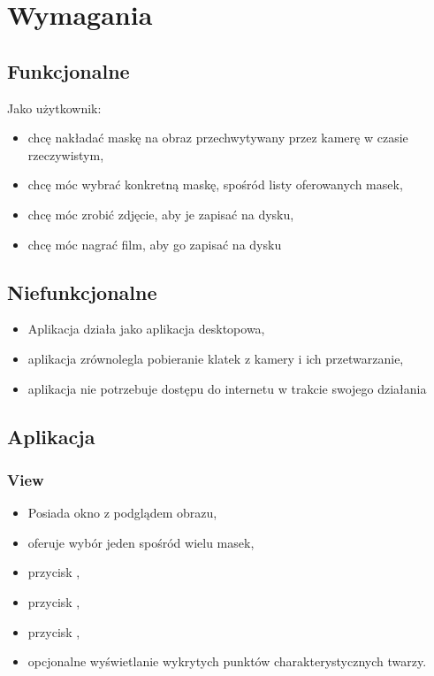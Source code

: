 \section{Wymagania}
\subsection{Funkcjonalne}
Jako użytkownik:
\begin{itemize}
    \item chcę nakładać maskę na obraz przechwytywany przez kamerę w czasie rzeczywistym,
    \item chcę móc wybrać konkretną maskę, spośród listy oferowanych masek,
    \item chcę móc zrobić zdjęcie, aby je zapisać na dysku,
    \item chcę móc nagrać film, aby go zapisać na dysku
\end{itemize}
\subsection{Niefunkcjonalne}
\begin{itemize}
    \item Aplikacja działa jako aplikacja desktopowa,
    \item aplikacja zrównolegla pobieranie klatek z kamery i ich przetwarzanie,
    \item aplikacja nie potrzebuje dostępu do internetu w trakcie swojego działania
\end{itemize}

\subsection{Aplikacja}
\subsubsection{View}
\begin{itemize}
    \item Posiada okno z podglądem obrazu,
    \item oferuje wybór jeden spośród wielu masek,
    \item przycisk ,
    \item przycisk ,
    \item przycisk ,
    \item opcjonalne wyświetlanie wykrytych punktów charakterystycznych twarzy.
\end{itemize}
